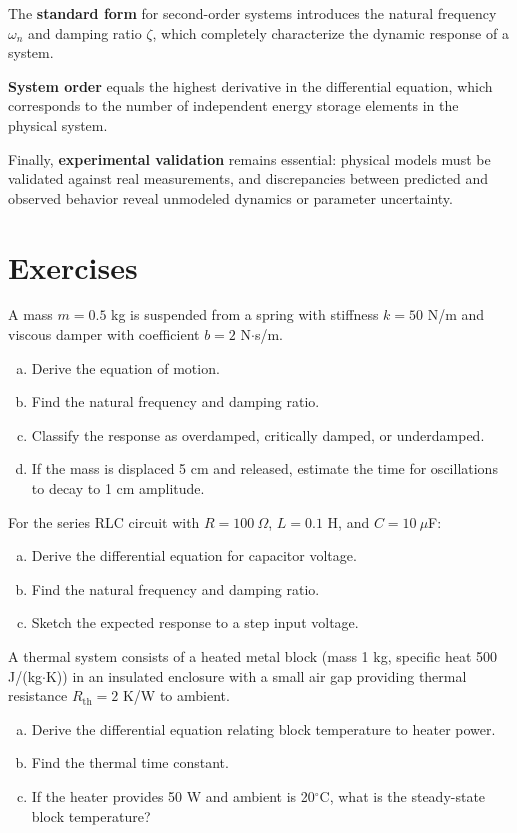 The \textbf{standard form} for second-order systems introduces the natural frequency $\omega_n$ and damping ratio $\zeta$, which completely characterize the dynamic response of a system.

\textbf{System order} equals the highest derivative in the differential equation, which corresponds to the number of independent energy storage elements in the physical system.

Finally, \textbf{experimental validation} remains essential: physical models must be validated against real measurements, and discrepancies between predicted and observed behavior reveal unmodeled dynamics or parameter uncertainty.

\newpage
\section{Exercises}

\begin{exercise}
A mass $m = 0.5$ kg is suspended from a spring with stiffness $k = 50$ N/m and viscous damper with coefficient $b = 2$ N$\cdot$s/m.
\begin{enumerate}[(a)]
    \item Derive the equation of motion.
    \item Find the natural frequency and damping ratio.
    \item Classify the response as overdamped, critically damped, or underdamped.
    \item If the mass is displaced 5 cm and released, estimate the time for oscillations to decay to 1 cm amplitude.
\end{enumerate}
\end{exercise}

\begin{exercise}
For the series RLC circuit with $R = 100\ \Omega$, $L = 0.1$ H, and $C = 10\ \mu$F:
\begin{enumerate}[(a)]
    \item Derive the differential equation for capacitor voltage.
    \item Find the natural frequency and damping ratio.
    \item Sketch the expected response to a step input voltage.
\end{enumerate}
\end{exercise}

\begin{exercise}
A thermal system consists of a heated metal block (mass 1 kg, specific heat 500 J/(kg$\cdot$K)) in an insulated enclosure with a small air gap providing thermal resistance $R_{\text{th}} = 2$ K/W to ambient.
\begin{enumerate}[(a)]
    \item Derive the differential equation relating block temperature to heater power.
    \item Find the thermal time constant.
    \item If the heater provides 50 W and ambient is 20$^\circ$C, what is the steady-state block temperature?
\end{enumerate}
\end{exercise}

